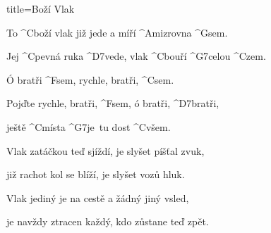 \begin{song}{title=\predtitle\centering Boží Vlak\\\large \vspace*{-0.3cm}}  %
\begin{centerjustified}
\nejnejvetsi
	
\sloka 
	To ^{C\z}boží vlak již jede a míří ^{Ami\z}zrovna ^{G\z}sem.
	
	Jej ^{C\z }pevná ruka ^{D7\z }vede, vlak ^{C\z}bouří ^{G7\z}celou ^{C\z}zem.
	
	Ó bratři ^{F\z }sem, rychle, bratři, ^{C\z }sem.
	
	Pojďte rychle, bratři, ^{F\z }sem, ó bratři, ^{D7\z}bratři, 
	
	ještě ^{C\z}místa ^{G7\z}je~tu dost ^{C\z}všem.
	
\sloka
	Vlak zatáčkou teď sjíždí, je slyšet píšťal zvuk,
	
	již rachot kol se blíží, je slyšet vozů hluk.
	

\sloka
	Vlak jediný je na cestě a žádný jiný vsled,
	
	je navždy ztracen každý, kdo zůstane teď zpět.
	
\end{centerjustified}

\centering
{}

\setcounter{Slokočet}{0}
\end{song}

